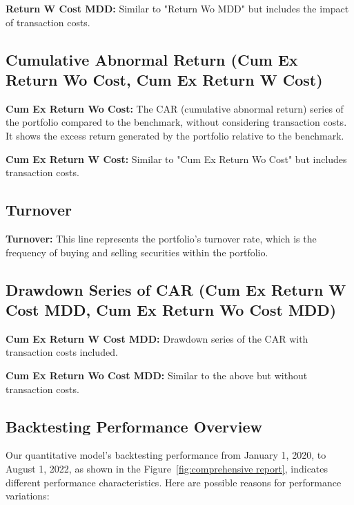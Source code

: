 \documentclass[conference]{IEEEtran}
\begin{document}
\textbf{Return W Cost MDD:}
Similar to "Return Wo MDD" but includes the impact of transaction costs.

\subsection*{\textbf{Cumulative Abnormal Return (Cum Ex Return Wo Cost, Cum Ex Return W Cost)}}

\textbf{Cum Ex Return Wo Cost:}
The CAR (cumulative abnormal return) series of the portfolio compared to the benchmark, without considering transaction costs. It shows the excess return generated by the portfolio relative to the benchmark.

\textbf{Cum Ex Return W Cost:}
Similar to "Cum Ex Return Wo Cost" but includes transaction costs.

\subsection*{Turnover}
\textbf{Turnover:}
This line represents the portfolio's turnover rate, which is the frequency of buying and selling securities within the portfolio.

\subsection*{\textbf{Drawdown Series of CAR (Cum Ex Return W Cost MDD, Cum Ex Return Wo Cost MDD)}}
\textbf{Cum Ex Return W Cost MDD:}
Drawdown series of the CAR with transaction costs included.

\textbf{Cum Ex Return Wo Cost MDD:}
Similar to the above but without transaction costs.

\begin{center}
\subsection*{\textbf{Backtesting Performance Overview}}
\end{center}

Our quantitative model's backtesting performance from January 1, 2020, to August 1, 2022, as shown in the Figure~\ref{fig:comprehensive report}, indicates different performance characteristics. Here are possible reasons for performance variations:
\end{document}
